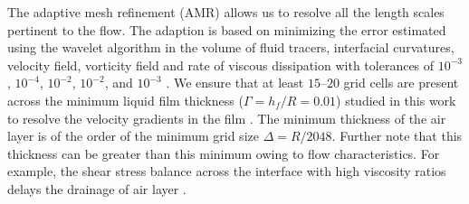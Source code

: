 The adaptive mesh refinement (AMR) allows us to resolve all the length scales pertinent to the flow.
The adaption is based on minimizing the error estimated using the wavelet algorithm \citep{popinet2015quadtree} in the volume of fluid tracers, interfacial curvatures, velocity field, vorticity field and rate of viscous dissipation with tolerances of $10^{-3}$, $10^{-4}$, $10^{-2}$, $10^{-2}$, and $10^{-3}$ \citep{basiliskVatsalDropFilm}. 
We ensure that at least $15$--$20$ grid cells are present across the minimum liquid film thickness ($\Gamma = h_f/R = 0.01$) studied in this work to resolve the velocity gradients in the film \citep{josserand2016droplet, ling2017spray}. 
The minimum thickness of the air layer is of the order of the minimum grid size $\Delta = R/2048$. Further note that this thickness can be greater than this minimum owing to flow characteristics. For example, the shear stress balance across the interface with high viscosity ratios delays the drainage of air layer \citep{zhang_ni_magnaudet_2021}.  

